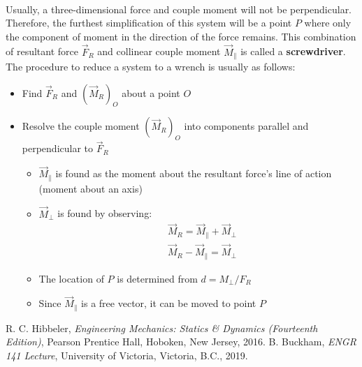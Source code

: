 \documentclass[12pt]{article}
\begin{document}
\paragraph{}
Usually, a three-dimensional force and couple moment will not be perpendicular.
Therefore, the furthest simplification of this system will be a point $P$ where only the component of moment in the direction of the force remains.
This combination of resultant force $\vec{F}_R$ and collinear couple moment $\vec{M}_{\parallel}$ is called a \textbf{screwdriver}.
The procedure to reduce a system to a wrench is usually as follows:
\begin{itemize}
    \item Find $\vec{F}_R$ and $(\vec{M}_R)_O$ about a point $O$
    \item Resolve the couple moment $(\vec{M}_R)_O$ into components parallel and perpendicular to $\vec{F}_R$
    \begin{itemize}
        \item $\vec{M}_{\parallel}$ is found as the moment about the resultant force's line of action (moment about an axis)
        \item $\vec{M}_{\perp}$ is found by observing:
            \begin{align*}
                & \vec{M}_R = \vec{M}_{\parallel} + \vec{M}_{\perp} \\
                & \vec{M}_R - \vec{M}_{\parallel} = \vec{M}_{\perp}
            \end{align*}
        \item The location of $P$ is determined from $d = M_{\perp}/F_R$
        \item Since $\vec{M}_{\parallel}$ is a free vector, it can be moved to point $P$
    \end{itemize}
\end{itemize}


\pagebreak
{}
\begin{thebibliography}{2}
    R. C. Hibbeler, \textit{Engineering Mechanics: Statics \& Dynamics (Fourteenth Edition)}, Pearson Prentice Hall, Hoboken, New Jersey, 2016.
    B. Buckham, \textit{ENGR 141 Lecture}, University of Victoria, Victoria, B.C., 2019.
\end{thebibliography}
\end{document}
